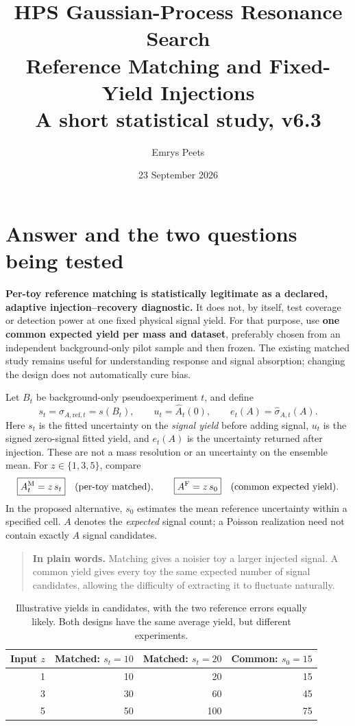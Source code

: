 \documentclass[11pt]{article}
\title{\vspace{-1em}HPS Gaussian-Process Resonance Search\\[.35em]
\large Reference Matching and Fixed-Yield Injections\\A short statistical study, v6.3}
\author{Emrys Peets}
\date{23 September 2026}
\newcommand{\Ah}{\widehat A}
\newcommand{\sh}{\widehat\sigma}
\newcommand{\plain}[1]{\begin{quote}\textbf{In plain words.} #1\end{quote}}
\begin{document}
\maketitle
\vspace{-.7em}

\section{Answer and the two questions being tested}
\textbf{Per-toy reference matching is statistically legitimate as a declared,
adaptive injection--recovery diagnostic.} It does not, by itself, test coverage
or detection power at one fixed physical signal yield. For that purpose, use
\textbf{one common expected yield per mass and dataset}, preferably chosen
from an independent background-only pilot sample and then frozen.
The existing matched study remains useful for understanding response and
signal absorption; changing the design does not automatically cure bias.

Let $B_t$ be background-only pseudoexperiment $t$, and define
\begin{equation}
 s_t=\sigma_{A,\mathrm{ref},t}=s(B_t),\qquad
 u_t=\Ah_t(0),\qquad e_t(A)=\sh_{A,t}(A).
 \label{eq:notation}
\end{equation}
Here $s_t$ is the fitted uncertainty on the \emph{signal yield} before adding
signal, $u_t$ is the signed zero-signal fitted yield, and $e_t(A)$ is the
uncertainty returned after injection. These are not a mass resolution or an
uncertainty on the ensemble mean. For $z\in\{1,3,5\}$, compare
\begin{equation}
 \boxed{A_t^{\mathrm M}=z\,s_t}\quad\hbox{(per-toy matched)},\qquad
 \boxed{A^{\mathrm F}=z\,s_0}\quad\hbox{(common expected yield)}.
 \label{eq:designs}
\end{equation}
In the proposed alternative, $s_0$ estimates the mean reference uncertainty
within a specified cell. $A$ denotes the \emph{expected} signal count; a
Poisson realization need not contain exactly $A$ signal candidates.

\plain{Matching gives a noisier toy a larger injected signal. A common yield
gives every toy the same expected number of signal candidates, allowing the
difficulty of extracting it to fluctuate naturally.}

\begin{table}[H]\centering
\begin{tabular}{rrrr}
\toprule
Input $z$ & Matched: $s_t=10$ & Matched: $s_t=20$ & Common: $s_0=15$\\
\midrule
1 & 10 & 20 & 15\\
3 & 30 & 60 & 45\\
5 & 50 & 100 & 75\\
\bottomrule
\end{tabular}
\caption{Illustrative yields in candidates, with the two reference errors equally
likely. Both designs have the same average yield, but different experiments.}
\end{table}
\end{document}
